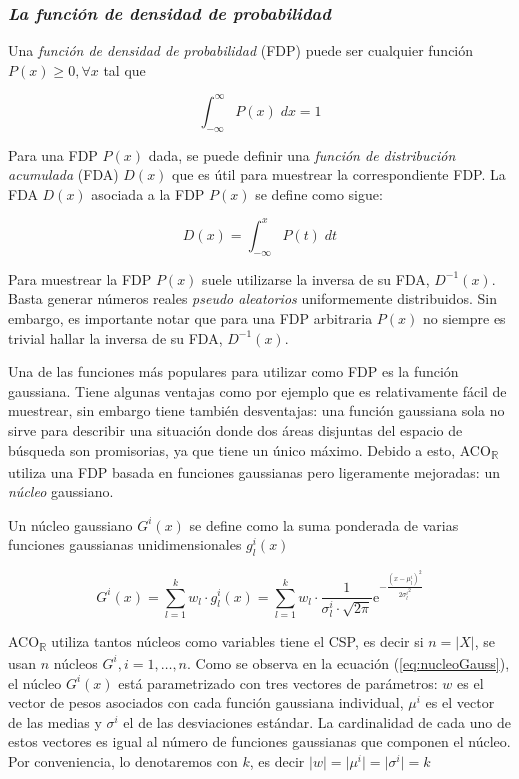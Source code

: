 \documentclass{llncs}
\begin{document}
	\subsubsection{\textit{La función de densidad de probabilidad}}
	Una \textit{función de densidad de probabilidad} (FDP) puede ser cualquier función $P(x) \geq 0, \forall x$ tal que
	
	\begin{equation*}
	\int_{-\infty}^{\infty}P(x)\;dx = 1
	\end{equation*}
	
	Para una FDP $P(x)$ dada, se puede definir una \textit{función de distribución acumulada} (FDA) $D(x)$ que es útil para muestrear la correspondiente FDP. La FDA $D(x)$ asociada a la FDP $P(x)$ se define como sigue:
	
	\begin{equation*}
	D(x) = \int_{-\infty}^{x}P(t)\;dt
	\end{equation*}
	
	Para muestrear la FDP $P(x)$ suele utilizarse la inversa de su FDA, $D^{-1}(x)$. Basta generar números 
	reales \textit{pseudo aleatorios} uniformemente distribuidos. Sin embargo, es importante notar que para una 
	FDP arbitraria $P(x)$ no siempre es trivial hallar la inversa de su FDA, $D^{-1}(x)$.
	
	Una de las funciones más populares para utilizar como FDP es la función gaussiana. Tiene algunas ventajas 
	como por ejemplo que es relativamente fácil de muestrear, sin embargo tiene también desventajas: una función
	gaussiana sola no sirve para describir una situación donde dos áreas disjuntas del espacio de búsqueda son 
	promisorias, ya que tiene un único máximo. Debido a esto, ACO\textsubscript{$\mathbb{R}$} utiliza una FDP basada 
	en funciones gaussianas pero ligeramente mejoradas: un \textit{núcleo} gaussiano.
	
	Un núcleo gaussiano $G^i(x)$ se define como la suma ponderada de varias funciones gaussianas unidimensionales $g^i_l(x)$
	
	\begin{equation}
	\label{eq:nucleoGauss}
	G^i(x) = \sum_{l=1}^{k}w_l \cdot g_l^i(x) = \sum_{l=1}^{k}w_l \cdot \frac{1}{\sigma_l^i \cdot \sqrt{2\pi}}\textrm{e}^{-\frac{(x - \mu^i_l)^2}{2{\sigma^i_l}^2}}
	\end{equation}

	ACO\textsubscript{$\mathbb{R}$} utiliza tantos núcleos como variables tiene el CSP, es decir si $n = \vert X \vert$, se usan $n$ núcleos $G^i, i = 1, \dots, n$. Como se observa en la ecuación (\ref{eq:nucleoGauss}), el núcleo $G^i(x)$ está parametrizado con tres vectores de parámetros: $w$ es el vector de pesos asociados con cada función gaussiana individual, $\mu^i$ es el vector de las medias y $\sigma^i$ el de las desviaciones estándar. La cardinalidad de cada uno de estos vectores es igual al número de funciones gaussianas que componen el núcleo. Por conveniencia, lo denotaremos con $k$, es decir $\vert w \vert = \vert \mu^i \vert = \vert \sigma^i \vert = k$
	
\end{document}
